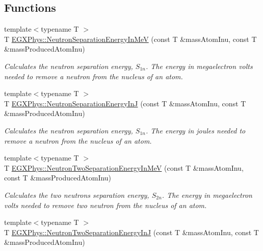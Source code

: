 \subsection*{Functions}
\begin{DoxyCompactItemize}
\item 
{\footnotesize template$<$typename T $>$ }\\T \mbox{\hyperlink{group___e_g_x_phys-_nuclear_separation_energy_ga66133edb5809c81dd9fd60e09ebbef79}{E\+G\+X\+Phys\+::\+Neutron\+Separation\+Energy\+In\+MeV}} (const T \&mass\+Atom\+Inu, const T \&mass\+Produced\+Atom\+Inu)
\begin{DoxyCompactList}\small\item\em Calculates the neutron separation energy, $S_{1n}$. The energy in megaelectron volts needed to remove a neutron from the nucleus of an atom. \end{DoxyCompactList}\item 
{\footnotesize template$<$typename T $>$ }\\T \mbox{\hyperlink{group___e_g_x_phys-_nuclear_separation_energy_ga14a4bb972ae000ef4ff35f2734ff22d0}{E\+G\+X\+Phys\+::\+Neutron\+Separation\+Energy\+InJ}} (const T \&mass\+Atom\+Inu, const T \&mass\+Produced\+Atom\+Inu)
\begin{DoxyCompactList}\small\item\em Calculates the neutron separation energy, $S_{1n}$. The energy in joules needed to remove a neutron from the nucleus of an atom. \end{DoxyCompactList}\item 
{\footnotesize template$<$typename T $>$ }\\T \mbox{\hyperlink{group___e_g_x_phys-_nuclear_separation_energy_ga09985fc876eb632695bfbc1f2f325401}{E\+G\+X\+Phys\+::\+Neutron\+Two\+Separation\+Energy\+In\+MeV}} (const T \&mass\+Atom\+Inu, const T \&mass\+Produced\+Atom\+Inu)
\begin{DoxyCompactList}\small\item\em Calculates the two neutrons separation energy, $S_{2n}$. The energy in megaelectron volts needed to remove two neutron from the nucleus of an atom. \end{DoxyCompactList}\item 
{\footnotesize template$<$typename T $>$ }\\T \mbox{\hyperlink{group___e_g_x_phys-_nuclear_separation_energy_ga293ac9428420a0adf4235048dbe529b4}{E\+G\+X\+Phys\+::\+Neutron\+Two\+Separation\+Energy\+InJ}} (const T \&mass\+Atom\+Inu, const T \&mass\+Produced\+Atom\+Inu)

\end{DoxyCompactItemize}
